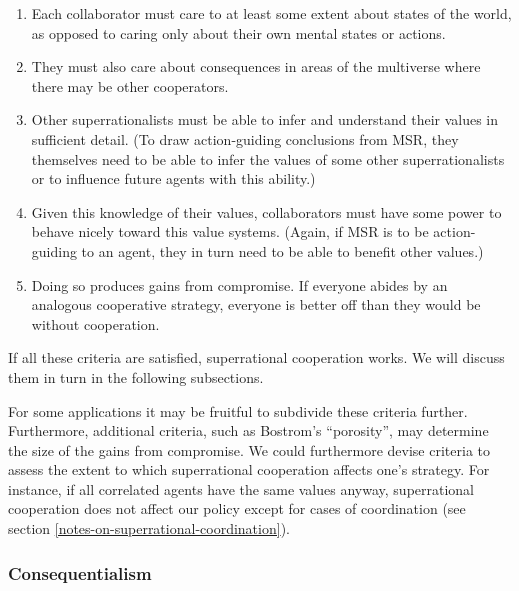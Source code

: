 \begin{enumerate}
\def\labelenumi{\arabic{enumi}.}
\item
  Each collaborator must care to at least some extent about states of
  the world, as opposed to caring only about their own mental states or
  actions.
\item
  They must also care about consequences in areas of the multiverse
  where there may be other cooperators.
\item
  Other superrationalists must be able to infer and understand their
  values in sufficient detail. (To draw action-guiding conclusions from
  MSR, they themselves need to be able to infer the values of some other
  superrationalists or to influence future agents with this ability.)
\item
  Given this knowledge of their values, collaborators must have some
  power to behave nicely toward this value systems. (Again, if MSR is to
  be action-guiding to an agent, they in turn need to be able to benefit
  other values.)
\item
  Doing so produces gains from compromise. If everyone abides by an
  analogous cooperative strategy, everyone is better off than they would
  be without cooperation.
\end{enumerate}

If all these criteria are satisfied, superrational cooperation works. We
will discuss them in turn in the following subsections.

For some applications it may be fruitful to subdivide these criteria
further. Furthermore, additional criteria, such as
Bostrom's \citeyear{Bostrom2014-gy} ``porosity'', may determine the
size of the gains from compromise. We could furthermore devise criteria
to assess the extent to which superrational cooperation affects one's
strategy. For instance, if all correlated agents have the same values
anyway, superrational cooperation does not affect our policy except for
cases of coordination (see section
\ref{notes-on-superrational-coordination}).

\hypertarget{consequentialism}{\subsubsection{Consequentialism}\label{consequentialism}}


